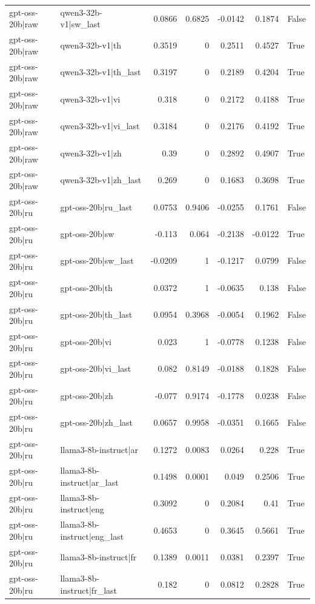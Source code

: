 \begin{table}
\begin{tabular}{l l r r r r l}
gpt-oss-20b|raw & qwen3-32b-v1|sw_last & 0.0866 & 0.6825 & -0.0142 & 0.1874 & False \\
gpt-oss-20b|raw & qwen3-32b-v1|th & 0.3519 & 0 & 0.2511 & 0.4527 & True \\
gpt-oss-20b|raw & qwen3-32b-v1|th_last & 0.3197 & 0 & 0.2189 & 0.4204 & True \\
gpt-oss-20b|raw & qwen3-32b-v1|vi & 0.318 & 0 & 0.2172 & 0.4188 & True \\
gpt-oss-20b|raw & qwen3-32b-v1|vi_last & 0.3184 & 0 & 0.2176 & 0.4192 & True \\
gpt-oss-20b|raw & qwen3-32b-v1|zh & 0.39 & 0 & 0.2892 & 0.4907 & True \\
gpt-oss-20b|raw & qwen3-32b-v1|zh_last & 0.269 & 0 & 0.1683 & 0.3698 & True \\
gpt-oss-20b|ru & gpt-oss-20b|ru_last & 0.0753 & 0.9406 & -0.0255 & 0.1761 & False \\
gpt-oss-20b|ru & gpt-oss-20b|sw & -0.113 & 0.064 & -0.2138 & -0.0122 & True \\
gpt-oss-20b|ru & gpt-oss-20b|sw_last & -0.0209 & 1 & -0.1217 & 0.0799 & False \\
gpt-oss-20b|ru & gpt-oss-20b|th & 0.0372 & 1 & -0.0635 & 0.138 & False \\
gpt-oss-20b|ru & gpt-oss-20b|th_last & 0.0954 & 0.3968 & -0.0054 & 0.1962 & False \\
gpt-oss-20b|ru & gpt-oss-20b|vi & 0.023 & 1 & -0.0778 & 0.1238 & False \\
gpt-oss-20b|ru & gpt-oss-20b|vi_last & 0.082 & 0.8149 & -0.0188 & 0.1828 & False \\
gpt-oss-20b|ru & gpt-oss-20b|zh & -0.077 & 0.9174 & -0.1778 & 0.0238 & False \\
gpt-oss-20b|ru & gpt-oss-20b|zh_last & 0.0657 & 0.9958 & -0.0351 & 0.1665 & False \\
gpt-oss-20b|ru & llama3-8b-instruct|ar & 0.1272 & 0.0083 & 0.0264 & 0.228 & True \\
gpt-oss-20b|ru & llama3-8b-instruct|ar_last & 0.1498 & 0.0001 & 0.049 & 0.2506 & True \\
gpt-oss-20b|ru & llama3-8b-instruct|eng & 0.3092 & 0 & 0.2084 & 0.41 & True \\
gpt-oss-20b|ru & llama3-8b-instruct|eng_last & 0.4653 & 0 & 0.3645 & 0.5661 & True \\
gpt-oss-20b|ru & llama3-8b-instruct|fr & 0.1389 & 0.0011 & 0.0381 & 0.2397 & True \\
gpt-oss-20b|ru & llama3-8b-instruct|fr_last & 0.182 & 0 & 0.0812 & 0.2828 & True \\

\end{tabular}
\end{table}
